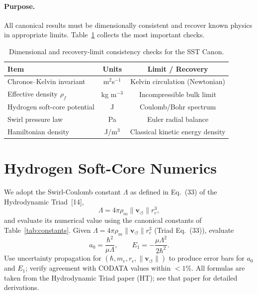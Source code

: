 \documentclass[10pt,reprint,aps,onecolumn,nofootinbib]{revtex4-2}
\begin{document}
    \paragraph{Purpose.}
        All canonical results must be dimensionally consistent and recover
        known physics in appropriate limits. Table~\ref{canon58:dim-checks}
        collects the most important checks.
        \begin{table}[h!]
            \centering
            \begin{tabular}{|l|c|c|}
                \hline
                \textbf{Item} & \textbf{Units} & \textbf{Limit / Recovery} \\
                \hline
                Chronos--Kelvin invariant & m$^{2}$s$^{-1}$ & Kelvin circulation (Newtonian) \\
                Effective density $\rho_{\!f}$ & kg m$^{-3}$ & Incompressible bulk limit \\
                Hydrogen soft-core potential & J & Coulomb/Bohr spectrum \\
                Swirl pressure law & Pa & Euler radial balance \\
                Hamiltonian density & J/m$^{3}$ & Classical kinetic energy density \\
                \hline
            \end{tabular}
            \caption{Dimensional and recovery-limit consistency checks for the SST Canon.}
            \label{canon58:dim-checks}
        \end{table}


    \section{Hydrogen Soft-Core Numerics}
    \label{canon58:appD}
    We adopt the Swirl-Coulomb constant $\Lambda$ as defined in Eq.~(33) of the Hydrodynamic Triad~[14],
    \[
        \Lambda = 4\pi \rho_{\!m} \lVert \mathbf{v}_{\!\boldsymbol{\circlearrowleft}}\rVert r_c^{3},
    \]
    and evaluate its numerical value using the canonical constants of Table~\ref{tab:constants}.
    Given $\Lambda = 4\pi \rho_{\!m} \lVert \mathbf{v}_{\!\boldsymbol{\circlearrowleft}}\rVert r_c^{3}$ (Triad Eq.~(33)),
    evaluate
    \[
        a_0 = \frac{\hbar^{2}}{\mu \Lambda}, \qquad
        E_1 = - \frac{\mu \Lambda^{2}}{2\hbar^{2}}.
    \]
    Use uncertainty propagation for $(\hbar, m_e, r_c, \lVert \mathbf{v}_{\!\boldsymbol{\circlearrowleft}}\rVert)$ to
    produce error bars for $a_0$ and $E_1$; verify agreement with CODATA values
    within $<1\%$. All formulas are taken from the Hydrodynamic Triad paper (HT); see that paper for detailed derivations.
\end{document}
